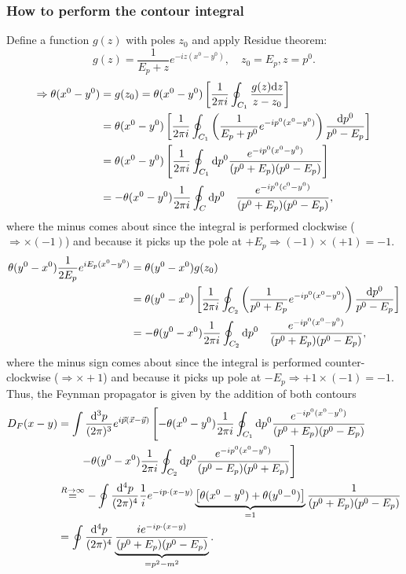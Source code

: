 \subsubsection{How to perform the contour integral}
Define a function $g(z)$ with poles $z_0$ and apply Residue theorem:
\begin{equation*}
	g(z) =\frac{1}{E_p+z} e^{-i z (x^0-y^0)}, \quad z_0 =E_p, z=p^0.
\end{equation*}
\begin{align*}
	\Rightarrow \theta(x^0-y^0)&=g(z_0)=\theta(x^0-y^0) \left[\frac{1}{2 \pi i} \oint_{C_1} \frac{g(z) \mathrm{d} z}{z-z_0}\right]\\
	&=\theta(x^0-y^0) \left[\frac{1}{2 \pi i}\oint_{C_1} \left(\frac{1}{E_p+p^0} e^{-i p^0 (x^0-y^0)} \right) \frac{\mathrm{d} p^0}{p^0-E_p}\right] \\
	&= \theta(x^0-y^0) \left[\frac{1}{2 \pi i} \oint_{C_1} \mathrm{d} p^0 \frac{e^{-i p^0(x^0-y^0)}}{(p^0+E_p)(p^0-E_p)}\right] \\
	&=-\theta(x^0-y^0) \frac{1}{2 \pi i} \oint_C \mathrm{d} p^0 \quad \frac{e^{-ip^0(c^0-y^0)}}{(p^0 + E_p)(p^0-E_p)},
\end{align*}
where the minus comes about since the integral is performed clockwise ($\Rightarrow \times (-1)$) and because it picks up the pole at $+E_p \Rightarrow (-1) \times (+1)=-1$.\\
\begin{align*}
	\theta(y^0-x^0) \frac{1}{2 E_p} e^{i E_p (x^0-y^0)} &= \theta(y^0-x^0) g(z_0) \\
	&=\theta(y^0-x^0) \left[\frac{1}{2 \pi i} \oint_{C_2} \left(\frac{1}{p^0+E_p} e^{-i p^0 (x^0-y^0)} \right) \frac{\mathrm{d} p^0}{p^0-E_p}\right] \\
	&= - \theta(y^0-x^0) \frac{1}{2 \pi i} \oint_{C_2} \mathrm{d} p^0 \quad \frac{e^{-i p^0(x^0-y^0)}}{(p^0+E_p)(p^0-E_p)},
\end{align*}
where the minus sign comes about since the integral is performed counter-clockwise ($\Rightarrow \times +1$) and because it picks up pole at $-E_p \Rightarrow +1 \times (-1)=-1$. Thus, the Feynman propagator is given by the addition of both contours
\begin{align*}
	D_F(x-y) &= \int \frac{\mathrm{d}^3 p}{(2 \pi)^3} e^{i \vec{p}(\vec{x}-\vec{y})} \left[-\theta(x^0-y^0) \frac{1}{2 \pi i} \oint_{C_1} \mathrm{d} p^0 \frac{e^{-i p^0(x^0-y^0)}}{(p^0+E_p)(p^0-E_p)} \right.\\
	&\left. \qquad - \theta(y^0-x^0) \frac{1}{2 \pi i} \oint_{C_2} \mathrm{d} p^0 \frac{e^{-i p^0(x^0-y^0)}}{(p^0-E_p)(p^0+E_p)}\right]\\
		&\stackrel{R\rightarrow\infty}{=} - \oint \frac{\mathrm{d}^4 p}{(2 \pi)^4} \frac{1}{i} e^{-i p\cdot (x-y)} \underbrace{\left[\theta(x^0-y^0)+\theta(y^0-^0)\right]}_{=1} \frac{1}{(p^0+E_p)(p^0-E_p)} \\
		&= \oint \frac{\mathrm{d}^4 p}{(2 \pi)^4} \underbrace{\frac{i e^{-i p\cdot(x-y)} }{(p^0+E_p)(p^0-E_p)}}_{=p^2-m^2}.
\end{align*}




